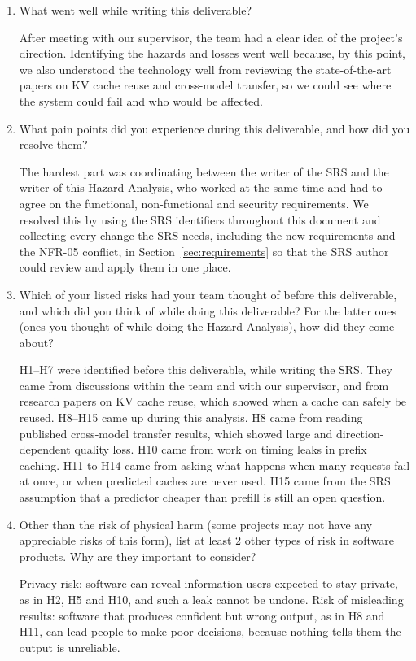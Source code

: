 \documentclass{article}
\begin{document}


\begin{enumerate}
    \item What went well while writing this deliverable?

    After meeting with our supervisor, the team had a clear idea of the
    project's direction. Identifying the hazards and losses went well
    because, by this point, we also understood the technology well from
    reviewing the state-of-the-art papers on KV cache reuse and cross-model
    transfer, so we could see where the system could fail and who would be
    affected.

    \item What pain points did you experience during this deliverable, and how
    did you resolve them?

    The hardest part was coordinating between the writer of the SRS and the
    writer of this Hazard Analysis, who worked at the same time and had to
    agree on the functional, non-functional and security requirements. We
    resolved this by using the SRS identifiers throughout this document and
    collecting every change the SRS needs, including the new requirements
    and the NFR-05 conflict, in Section~\ref{sec:requirements} so that the SRS
    author could review and apply them in one place.

    \item Which of your listed risks had your team thought of before this
    deliverable, and which did you think of while doing this deliverable? For
    the latter ones (ones you thought of while doing the Hazard Analysis), how
    did they come about?

    H1--H7 were identified before this
    deliverable, while writing the SRS. They came from discussions within
    the team and with our supervisor, and from research papers on KV cache
    reuse, which showed when a cache can safely be reused. H8--H15 came up
    during this analysis. H8 came from reading published cross-model
    transfer results, which showed large and direction-dependent quality
    loss. H10 came from work on timing leaks in prefix caching. H11 to H14
    came from asking what happens when many requests fail at once, or when
    predicted caches are never used. H15 came from the SRS assumption that a
    predictor cheaper than prefill is still an open question.

    \item Other than the risk of physical harm (some projects may not have any
    appreciable risks of this form), list at least 2 other types of risk in
    software products. Why are they important to consider?

    Privacy risk: software can reveal
    information users expected to stay private, as in H2, H5 and H10, and
    such a leak cannot be undone. Risk of misleading results: software that
    produces confident but wrong output, as in H8 and H11, can lead people
    to make poor decisions, because nothing tells them the output is
    unreliable.
\end{enumerate}
\end{document}
